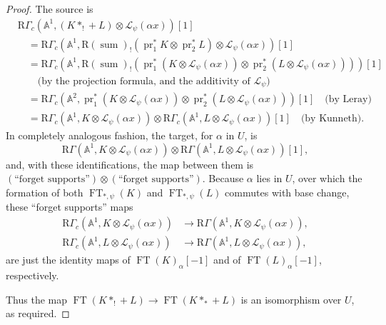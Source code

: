 \begin{proof}
The source is
\[
  \begin{aligned}
  &\mathrm{R}\Gamma_c(\mathbb{A}^1,(K*_!+L)\otimes\mathcal{L}_\psi(\alpha x))[1]\\
  &\quad=
  \mathrm{R}\Gamma_c(\mathbb{A}^1,
    \mathrm{R}(\operatorname{sum})_!(\operatorname{pr}_1^*K\otimes
    \operatorname{pr}_2^*L)\otimes\mathcal{L}_\psi(\alpha x))[1]\\
  &\quad=
  \mathrm{R}\Gamma_c(\mathbb{A}^1,
    \mathrm{R}(\operatorname{sum})_!(\operatorname{pr}_1^*(K\otimes
    \mathcal{L}_\psi(\alpha x))\otimes
    \operatorname{pr}_2^*(L\otimes\mathcal{L}_\psi(\alpha x))))[1]\\
  &\qquad\text{(by the projection formula, and the additivity of \(\mathcal{L}_\psi\))}\\
  &\quad=
  \mathrm{R}\Gamma_c(\mathbb{A}^2,
    \operatorname{pr}_1^*(K\otimes\mathcal{L}_\psi(\alpha x))\otimes
    \operatorname{pr}_2^*(L\otimes\mathcal{L}_\psi(\alpha x)))[1]\quad
    \text{(by Leray)}\\
  &\quad=
  \mathrm{R}\Gamma_c(\mathbb{A}^1,K\otimes\mathcal{L}_\psi(\alpha x))
  \otimes
  \mathrm{R}\Gamma_c(\mathbb{A}^1,L\otimes\mathcal{L}_\psi(\alpha x))[1]
  \quad\text{(by Kunneth).}
  \end{aligned}
\]
In completely analogous fashion, the target, for \(\alpha\) in \(U\), is
\[
  \mathrm{R}\Gamma(\mathbb{A}^1,K\otimes\mathcal{L}_\psi(\alpha x))\otimes
  \mathrm{R}\Gamma(\mathbb{A}^1,L\otimes\mathcal{L}_\psi(\alpha x))[1],
\]
and, with these identifications, the map between them is
\((\text{``forget supports''})\otimes(\text{``forget supports''})\).
Because \(\alpha\) lies in \(U\), over which the formation of both
\(\operatorname{FT}_{*,\psi}(K)\) and \(\operatorname{FT}_{*,\psi}(L)\)
commutes with base change, these ``forget supports'' maps
\[
  \begin{aligned}
  \mathrm{R}\Gamma_c(\mathbb{A}^1,K\otimes\mathcal{L}_\psi(\alpha x))
    &\to \mathrm{R}\Gamma(\mathbb{A}^1,K\otimes\mathcal{L}_\psi(\alpha x)),\\
  \mathrm{R}\Gamma_c(\mathbb{A}^1,L\otimes\mathcal{L}_\psi(\alpha x))
    &\to \mathrm{R}\Gamma(\mathbb{A}^1,L\otimes\mathcal{L}_\psi(\alpha x)),
  \end{aligned}
\]
are just the identity maps of \(\operatorname{FT}(K)_\alpha[-1]\) and of
\(\operatorname{FT}(L)_\alpha[-1]\), respectively.

Thus the map
\(\operatorname{FT}(K*_!+L)\to\operatorname{FT}(K*_*+L)\) is an isomorphism
over \(U\), as required.
\end{proof}


